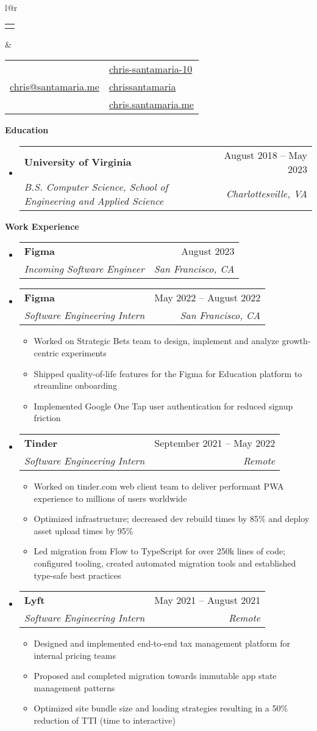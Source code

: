 \documentclass[letterpaper,12pt]{article}[leftmargin=*]
\makeatletter
\def \fullname {Chris Santamaria}
\def \linkedinicon {\faLinkedinSquare}
\def \linkedinlink {https://www.linkedin.com/in/chris-santamaria-10}
\def \linkedintext {chris-santamaria-10}
\def \phoneicon {\faPhone}
\def \phonetext {(813) 545-5164}
\def \emailicon {\faEnvelope}
\def \emaillink {mailto:chris@santamaria.me}
\def \emailtext {chris@santamaria.me}
\def \locationicon {\faMapMarker}
\def \locationtext {Saint Petersburg, FL}
\def \githubicon {\faGithub}
\def \githublink {https://github.com/chrissantamaria}
\def \githubtext {chrissantamaria}
\def \websiteicon {\faGlobe}
\def \websitelink {https://chris.santamaria.me}
\def \websitetext {chris.santamaria.me}
\def \headertype {\doublecol} %
\def \entryspacing {-0pt}
\def \linkedin {\linkedinicon \hspace{3pt}\href{\linkedinlink}{\linkedintext}}
\def \phone {\phoneicon \hspace{3pt}{ \phonetext}}
\def \email {\emailicon \hspace{4pt}\href{\emaillink}{\emailtext}}
\def \location {\hspace{0pt} \locationicon \hspace{2pt}{ \locationtext}}
\def \github {\githubicon \hspace{3pt}\href{\githublink}{\githubtext}}
\def \website {\websiteicon \hspace{3pt}\href{\websitelink}{\websitetext}}
\renewcommand{\section}[2]{\vspace{5pt}
  \colorbox{secondary}{\color{white}\raggedbottom\normalsize\textbf{{#1}{\hspace{7pt}#2}}}
}
\newcommand{\resumeEntryStart}{\begin{itemize}[leftmargin=2.5mm]}
\newcommand{\resumeEntryEnd}{\end{itemize}\vspace{\entryspacing}}
\newcommand{\resumeItemListStart}{\begin{itemize}[leftmargin=4.5mm]}
\newcommand{\resumeItemListEnd}{\end{itemize}}
\newcommand{\resumeItem}[1]{
  \item\small{
    {#1 \vspace{-2pt}}
  }
}
\newcommand{\resumeEntryTSDL}[4]{
  \vspace{-1pt}\item[]
    \begin{tabular*}{0.97\textwidth}{l@{\extracolsep{\fill}}r}
      \textbf{\color{primary}#1} & {\firabook\color{accent}\small#2} \\
      \textit{\color{accent}\small#3} & \textit{\color{accent}\small#4} \\
    \end{tabular*}\vspace{-7pt}
}
\newcommand{\doublecol}[6]{
  \begin{tabular*}{\textwidth}{l@{\extracolsep{\fill}}r}
    {
      \begin{tabular}[c]{l}
        \fontsize{35}{45}\selectfont{\color{primary}{{\textbf{\fullname}}}}
      \end{tabular}
    } & {
      \begin{tabular}[c]{l@{\hspace{1.5em}}l}
        {\small#4} & {\small#1} \\
        {\small#5} & {\small#2} \\
        {\small#6} & {\small#3}
      \end{tabular}
    }
  \end{tabular*}
}
\newcommand{\singlecol}[6]{
  \begin{tabular*}{\textwidth}{l@{\extracolsep{\fill}}r}
    {
      \begin{tabular}[b]{l}
        \fontsize{35}{45}\selectfont{\color{primary}{{\textbf{\fullname}}}} \\
        {\textit{\subtitle}} %
      \end{tabular}
    } & {
      \begin{tabular}[c]{l}
        {\small#1} \\
        {\small#2} \\
        {\small#3} \\
        {\small#4} \\
        {\small#5} \\
        {\small#6}
      \end{tabular}
    }
  \end{tabular*}
}
\makeatother
\begin{document}
\headertype
{\linkedin}
{\github}
{\website}
{\phone}
{\email}
{\location}
\vspace{0pt} %

\section{\faGraduationCap}{Education}

\resumeEntryStart
\resumeEntryTSDL
{University of Virginia}
{August 2018 -- May 2023}
{B.S. Computer Science, School of Engineering and Applied Science}{Charlottesville, VA}
\resumeEntryEnd

\section{\faCode}{Work Experience}

\resumeEntryStart
\resumeEntryTSDL
{Figma}
{August 2023}
{Incoming Software Engineer}
{San Francisco, CA}
\resumeEntryEnd

\resumeEntryStart
\resumeEntryTSDL
{Figma}
{May 2022 -- August 2022}
{Software Engineering Intern}
{San Francisco, CA}
\resumeItemListStart
\resumeItem {Worked on Strategic Bets team to design, implement and analyze growth-centric experiments}
\resumeItem {Shipped quality-of-life features for the Figma for Education platform to streamline onboarding}
\resumeItem {Implemented Google One Tap user authentication for reduced signup friction}
\resumeItemListEnd
\resumeEntryEnd

\resumeEntryStart
\resumeEntryTSDL
{Tinder}
{September 2021 -- May 2022}
{Software Engineering Intern}
{Remote}
\resumeItemListStart
\resumeItem {Worked on tinder.com web client team to deliver performant PWA experience to millions of users worldwide}
\resumeItem {Optimized infrastructure; decreased dev rebuild times by 85\% and deploy asset upload times by 95\%}
\resumeItem {Led migration from Flow to TypeScript for over 250k lines of code; configured tooling, created automated migration tools and established type-safe best practices}
\resumeItemListEnd
\resumeEntryEnd

\resumeEntryStart
\resumeEntryTSDL
{Lyft}
{May 2021 -- August 2021}
{Software Engineering Intern}
{Remote}
\resumeItemListStart
\resumeItem {Designed and implemented end-to-end tax management platform for internal pricing teams}
\resumeItem {Proposed and completed migration towards immutable app state management patterns}
\resumeItem {Optimized site bundle size and loading strategies resulting in a 50\% reduction of TTI (time to interactive)}
\resumeItemListEnd
\resumeEntryEnd
\end{document}

